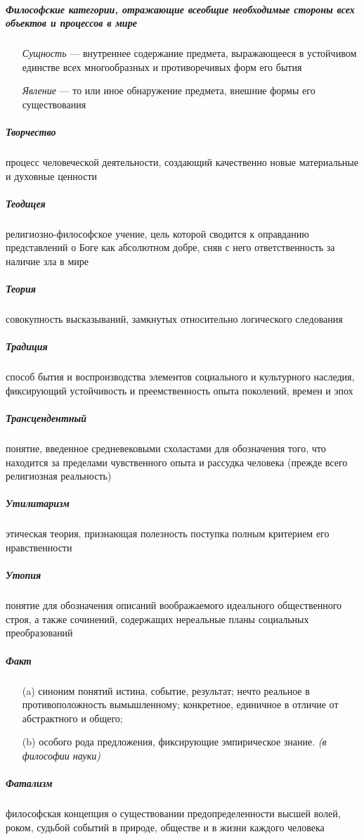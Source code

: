 \documentclass[a4paper, 12pt]{article}
\theoremstyle{plain} %
\theoremstyle{definition} %
\theoremstyle{remark} %
\begin{document}
\subparagraph{Философские категории, отражающие всеобщие необходимые стороны всех объектов и процессов в мире}
\begin{itemize}
	\item[] \emph{Сущность} --- внутреннее содержание предмета, выражающееся в устойчивом единстве всех многообразных и противоречивых форм его бытия
	\item[] \emph{Явление} --- то или иное обнаружение предмета, внешние формы его существования
\end{itemize}

\subparagraph{Творчество}
	процесс человеческой деятельности, создающий качественно новые материальные и духовные ценности

\subparagraph{Теодицея}
	религиозно-философское учение, цель которой сводится к оправданию представлений о Боге как абсолютном добре, сняв с него ответственность за наличие зла в мире

\subparagraph{Теория}
	совокупность высказываний, замкнутых относительно логического следования


\subparagraph{Традиция}
	способ бытия и воспроизводства элементов социального и культурного наследия, фиксирующий устойчивость и преемственность опыта поколений, времен и эпох

\subparagraph{Трансцендентный}
	понятие, введенное средневековыми схоластами для обозначения того, что находится за пределами чувственного опыта и рассудка человека (прежде всего религиозная реальность)

\subparagraph{Утилитаризм}
	этическая теория, признающая полезность поступка полным критерием его нравственности

\subparagraph{Утопия}
	понятие для обозначения описаний воображаемого идеального общественного строя, а также сочинений, содержащих нереальные планы социальных преобразований

\subparagraph{Факт}
\begin{itemize}
	\item[(a)] синоним понятий истина, событие, результат; нечто реальное в противоположность вымышленному; конкретное, единичное в отличие от абстрактного и общего;
	\item[(b)] особого рода предложения, фиксирующие эмпирическое знание. \emph{(в философии науки)}
\end{itemize}

\subparagraph{Фатализм}
	философская концепция о существовании предопределенности высшей волей, роком, судьбой событий в природе, обществе и в жизни каждого человека
\end{document}
